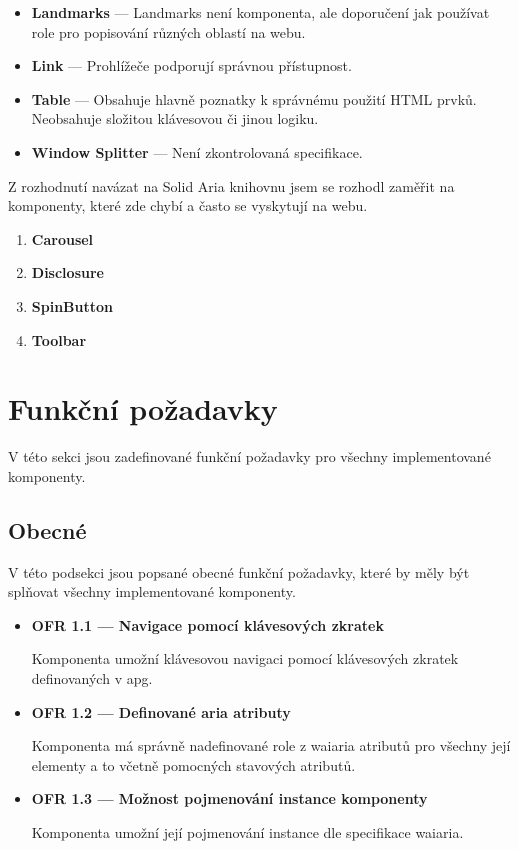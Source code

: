 \begin{itemize}
      \item \textbf{Landmarks} --- Landmarks není komponenta, ale doporučení jak používat role pro popisování různých oblastí na webu.
      \item \textbf{Link} --- Prohlížeče podporují správnou přístupnost.
      \item \textbf{Table} --- Obsahuje hlavně poznatky k správnému použití HTML prvků. Neobsahuje složitou klávesovou či jinou logiku.
      \item \textbf{Window Splitter} --- Není zkontrolovaná specifikace.
\end{itemize}


Z rozhodnutí navázat na Solid Aria knihovnu jsem se rozhodl zaměřit na komponenty, které zde chybí a často se vyskytují na webu.

\begin{enumerate}
      \item \textbf{Carousel}
      \item \textbf{Disclosure}
      \item \textbf{SpinButton}
      \item \textbf{Toolbar}
\end{enumerate}

\section{Funkční požadavky}

V této sekci jsou zadefinované funkční požadavky pro všechny implementované komponenty.

\subsection{Obecné}

V této podsekci jsou popsané obecné funkční požadavky, které by měly být splňovat všechny implementované komponenty.

\begin{itemize}
      \item \textbf{OFR 1.1 --- Navigace pomocí klávesových zkratek}\label{ofr11}

            Komponenta umožní klávesovou navigaci pomocí klávesových zkratek definovaných v \gls{apg}.

      \item \textbf{OFR 1.2 --- Definované aria atributy}\label{ofr12}

            Komponenta má správně nadefinované role z \gls{waiaria} atributů pro všechny její elementy a to včetně pomocných stavových atributů.

      \item \textbf{OFR 1.3 --- Možnost pojmenování instance komponenty}\label{ofr13}

            Komponenta umožní její pojmenování instance dle specifikace \gls{waiaria}.
\end{itemize}

